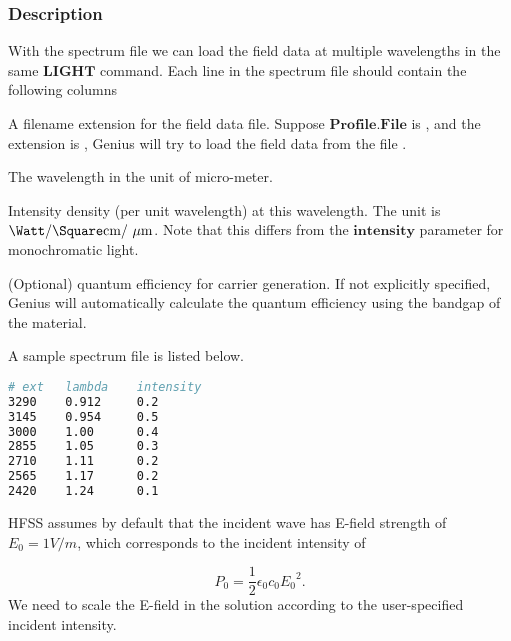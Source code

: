 \documentclass[oneside,12pt]{cgd_book}
\begin{document}
\par
\subsubsection{Description}
With the spectrum file we can load the field data at multiple wavelengths in the same
$\mathbf{LIGHT}$ command. Each line in the spectrum file should contain the following
            columns
\begin{compactitem}
\item A filename extension for the field data file. Suppose $\mathbf{Profile.File}$
is , and the extension is , Genius will try to load
                  the field data from the file .
\par
\item The wavelength in the unit of micro-meter.
\par
\item Intensity density (per unit wavelength) at this wavelength. The unit is
$\Watt\Per\Square\cMeter\Per\uMeter$. Note that this differs from the
$\mathbf{intensity}$ parameter for monochromatic light.
\par
\item (Optional) quantum efficiency for carrier generation. If not explicitly specified, Genius will
                  automatically calculate the quantum efficiency using the bandgap of the material.
\par
\end{compactitem}
\par
\par
A sample spectrum file is listed below.
\par
\begin{lstlisting}[language=sh]
# ext   lambda    intensity
3290    0.912     0.2
3145    0.954     0.5
3000    1.00      0.4
2855    1.05      0.3
2710    1.11      0.2
2565    1.17      0.2
2420    1.24      0.1
\end{lstlisting}
HFSS assumes by default that the incident wave has E-field strength of
$E_0=1 V/m$, which corresponds to the incident intensity of
\par
\par
\begin{equation}
P_0 = \frac{1}{2} \epsilon_0 c_0 {E_0}^2.
\end{equation}
We need to scale the E-field in the solution according to the user-specified incident intensity.
\end{document}
